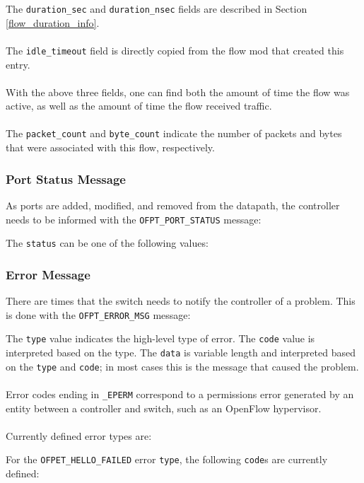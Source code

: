 
The \verb|duration_sec| and \verb|duration_nsec| fields are described in Section \ref{flow_duration_info}.
\\\\
The \verb|idle_timeout| field is directly copied from the flow mod that created this entry. 
\\\\
With the above three fields, one can find both the amount of time the flow was active, as well as the amount of time the flow received traffic.
\\\\
The \verb|packet_count| and \verb|byte_count| indicate the number of packets and bytes that were associated with this flow, respectively. 
 
\subsubsection{Port Status Message}
As ports are added, modified, and removed from the datapath, the controller needs to be informed with the \verb|OFPT_PORT_STATUS| message:


The \verb|status| can be one of the following values:

 

\subsubsection{Error Message}
There are times that the switch needs to notify the controller of a problem.  This is done with the \verb|OFPT_ERROR_MSG| message: 	


The \verb|type| value indicates the high-level type of error.  The \verb|code| value is interpreted based on the type.  The \verb|data| is variable length and interpreted based on the \verb|type| and \verb|code|; in most cases this is the message that caused the problem.  
\\\\
Error codes ending in \verb|_EPERM| correspond to a permissions error generated by an entity between a controller and switch, such as an OpenFlow hypervisor. 
\\\\
Currently defined error types are:


For the \verb|OFPET_HELLO_FAILED| error \verb|type|, the following \verb|code|s are currently defined:

